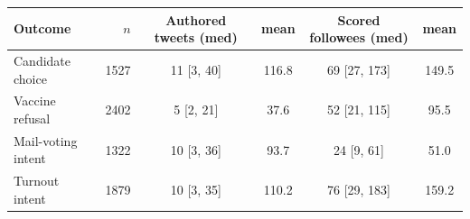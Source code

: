 \begin{tabular}{lrcccc}
\toprule
Outcome & $n$ & Authored tweets (med) & mean & Scored followees (med) & mean \\
\midrule
Candidate choice & 1527 & 11 [3, 40] & 116.8 & 69 [27, 173] & 149.5 \\
Vaccine refusal & 2402 & 5 [2, 21] & 37.6 & 52 [21, 115] & 95.5 \\
Mail-voting intent & 1322 & 10 [3, 36] & 93.7 & 24 [9, 61] & 51.0 \\
Turnout intent & 1879 & 10 [3, 35] & 110.2 & 76 [29, 183] & 159.2 \\
\bottomrule
\end{tabular}